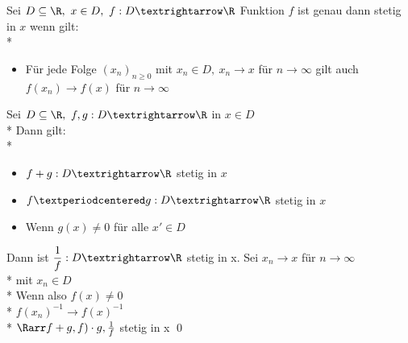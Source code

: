 Sei $D\subseteq\R,\ x\in D,\ f:D→\R$ Funktion $f$ ist genau dann stetig in $x$ wenn gilt:\\*
\begin{itemize}
\item{Für jede Folge $(x_n)_{n\geq 0}$ mit $x_n\in D,\ x_n→x$ für $n→∞$ gilt auch $f(x_n)→f(x)$ für $n→∞$}
\end{itemize}

Sei $D\subseteq\R,\ f,g:D→\R$ in $x\in D$\\*
Dann gilt:\\*
\begin{itemize}
\item{$f+g:D→\R$ stetig in $x$}
\item{$f·g:D→\R$ stetig in $x$}
\item{Wenn $g(x)\neq 0$ für alle $x'\in D$}
\end{itemize}
Dann ist $\dfrac{1}{f}:D→\R$ stetig in x.
Sei $x_n \to x$ für $n \to \infty$\\*
mit $x_n \in D$\\*
Wenn also $f(x) \neq 0$\\*
$f(x_n)^{-1} \to f(x)^{-1}$\\*
$\Rarr f + g, f) \cdot g, \frac{1}{f}$ stetig in x \qed